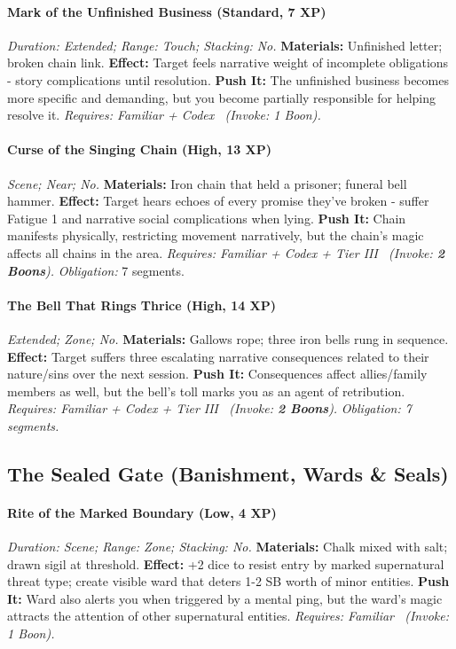 \paragraph{Mark of the Unfinished Business (Standard, 7 XP)} \emph{Duration: Extended; Range: Touch; Stacking: No.}
\textbf{Materials:} Unfinished letter; broken chain link.
\textbf{Effect:} Target feels narrative weight of incomplete obligations - story complications until resolution.
\textbf{Push It:} The unfinished business becomes more specific and demanding, but you become partially responsible for helping resolve it.
\emph{Requires: Familiar + Codex \ (\textit{Invoke:} 1 Boon).}
\paragraph{Curse of the Singing Chain (High, 13 XP)} \emph{Scene; Near; No.}
\textbf{Materials:} Iron chain that held a prisoner; funeral bell hammer.
\textbf{Effect:} Target hears echoes of every promise they've broken - suffer Fatigue 1 and narrative social complications when lying.
\textbf{Push It:} Chain manifests physically, restricting movement narratively, but the chain's magic affects all chains in the area.
\emph{Requires: Familiar + Codex + Tier III \ (\textit{Invoke:} \textbf{2 Boons}).}
\emph{Obligation:} 7 segments.

\paragraph{The Bell That Rings Thrice (High, 14 XP)} \emph{Extended; Zone; No.}
\textbf{Materials:} Gallows rope; three iron bells rung in sequence.
\textbf{Effect:} Target suffers three escalating narrative consequences related to their nature/sins over the next session.
\textbf{Push It:} Consequences affect allies/family members as well, but the bell's toll marks you as an agent of retribution.
\emph{Requires: Familiar + Codex + Tier III \ (\textit{Invoke:} \textbf{2 Boons}).}
\emph{Obligation: 7 segments.}

\subsection{The Sealed Gate (Banishment, Wards \& Seals)}
\paragraph{Rite of the Marked Boundary (Low, 4 XP)} \emph{Duration: Scene; Range: Zone; Stacking: No.}
\textbf{Materials:} Chalk mixed with salt; drawn sigil at threshold.
\textbf{Effect:} +2 dice to resist entry by marked supernatural threat type; create visible ward that deters 1-2 SB worth of minor entities.
\textbf{Push It:} Ward also alerts you when triggered by a mental ping, but the ward's magic attracts the attention of other supernatural entities.
\emph{Requires: Familiar \ (\textit{Invoke:} 1 Boon).}
